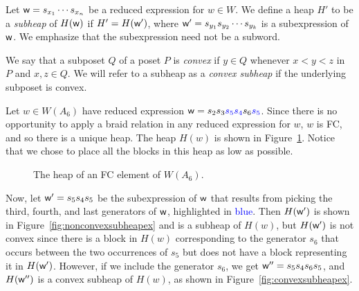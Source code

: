 \begin{definition}\label{def:subheap} Let $\mathsf{w} = s_{x_{1}} \cdots s_{x_{n}}$ be a reduced expression for $w \in W$.  We define a heap $H'$ to be a \emph{subheap} of $H(\mathsf{w})$ if $H' = H(\mathsf{w}')$, where $\mathsf{w}' = s_{y_1}s_{y_2} \cdots s_{y_k}$ is a subexpression of $\mathsf{w}$. We emphasize that the subexpression need not be a subword.
\end{definition} 

    We say that a subposet $Q$ of a poset $P$ is \emph{convex} if $y \in Q$ whenever $x < y < z$ in $P$ and $x, z \in Q$. We will refer to a subheap as a \emph{convex subheap} if the underlying subposet is convex.  

\begin{example} Let $w \in W(A_6)$ have reduced expression $\mathsf{w} = s_2 s_3 \textcolor{blue}{s_5 s_4} s_6 \textcolor{blue}{s_5}$. Since there is no opportunity to apply a braid relation in any reduced expression for $w$, $w$ is FC, and so there is a unique heap.
    The heap $H(w)$ is shown in Figure~\ref{fig:FCheapex}. Notice that we chose to place all the blocks in this heap as low as possible.

\begin{center} \begin{figure}[H] \centering
{}
\caption{The heap of an FC element of $W(A_6)$.}\label{fig:FCheapex}
\end{figure} \end{center}
   
    Now, let $\mathsf{w}' = s_5 s_4 s_5$ be the subexpression of $\mathsf{w}$ that results from picking the third, fourth, and last generators of $\mathsf{w}$, highlighted in \textcolor{blue}{blue}. Then $H(\mathsf{w}')$ is shown in Figure~\ref{fig:nonconvexsubheapex} and is a subheap of $H(w)$, but $H(\mathsf{w}')$ is not convex since there is a block in $H(w)$ corresponding to the generator $s_6$ that occurs between the two occurrences of $s_5$ but does not have a block representing it in $H(\mathsf{w}')$.
    However, if we include the generator $s_6$, we get $\mathsf{w}'' = s_5 s_4 s_6 s_5$, and $H(\mathsf{w}'')$ is a convex subheap of $H(w)$, as shown in Figure~\ref{fig:convexsubheapex}.


\end{example}
